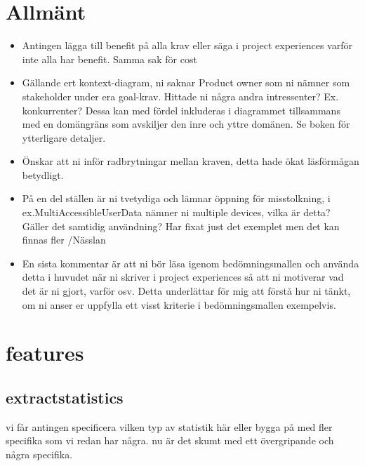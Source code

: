 \documentclass[a4paper]{article}
\begin{document}
	\thispagestyle{empty}
	\setcounter{page}{0}
	\pagebreak
	\tableofcontents
	\pagebreak

\section{Allmänt}
\begin{itemize}

	\item Antingen lägga till benefit på alla krav eller säga i project experiences varför inte alla har benefit. Samma sak för cost
	
	\item Gällande ert kontext-diagram, ni saknar Product owner som ni nämner som stakeholder under era goal-krav. Hittade ni några andra intressenter? Ex. konkurrenter? Dessa kan med fördel inkluderas i diagrammet tillsammans med en domängräns som avskiljer den inre och yttre domänen. Se boken för ytterligare detaljer.
	
	
	
	\item Önskar att ni inför radbrytningar mellan kraven, detta hade ökat läsförmågan betydligt.
	

	\item På en del ställen är ni tvetydiga och lämnar öppning för misstolkning, i ex.MultiAccessibleUserData nämner ni multiple devices, vilka är detta? Gäller det samtidig användning? Har fixat just det exemplet men det kan finnas fler /Nässlan
	
	
	\item En sista kommentar är att ni bör läsa igenom bedömningsmallen och använda detta i huvudet när ni skriver i project experiences så att ni motiverar vad det är ni gjort, varför osv. Detta underlättar för mig att förstå hur ni tänkt, om ni anser er uppfylla ett visst kriterie i bedömningsmallen exempelvis.
	
	
	
	
\end{itemize}


\section{features}

		
	\subsection{extractstatistics}
vi får antingen specificera vilken typ av statistik  här eller bygga på med  fler specifika som vi redan har några. nu är det skumt med ett övergripande och några specifika.
	
\end{document}

